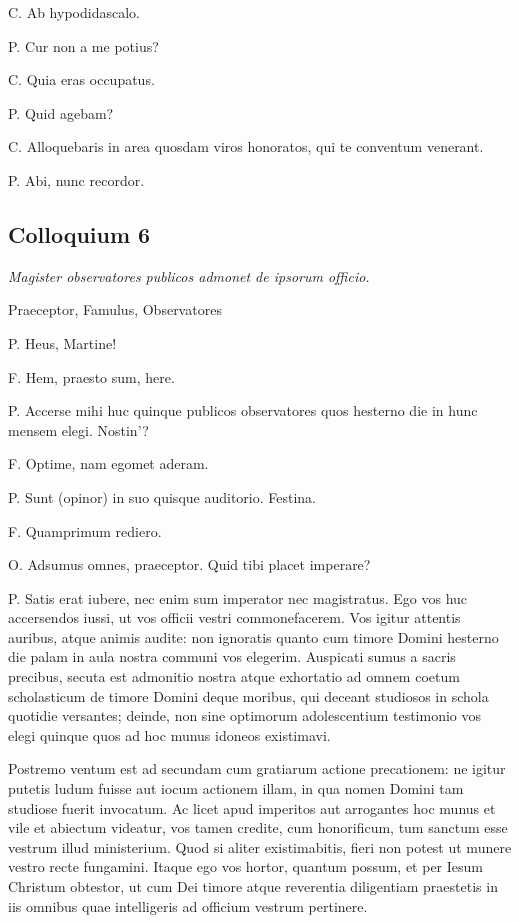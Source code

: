 \documentclass{article}
\begin{document}
C. Ab hypodidascalo.

P. Cur non a me potius?

C. Quia eras occupatus.

P. Quid agebam?

C. Alloquebaris in area quosdam viros honoratos, qui te conventum venerant.

P. Abi, nunc recordor.

\subsection{Colloquium 6}
\emph{Magister observatores publicos admonet de ipsorum officio.}

Praeceptor, Famulus, Observatores

P. Heus, Martine!

F. Hem, praesto sum, here.

P. Accerse mihi huc quinque publicos observatores quos hesterno die in hunc mensem elegi. Nostin'?

F. Optime, nam egomet aderam.

P. Sunt (opinor) in suo quisque auditorio. Festina.

F. Quamprimum rediero.

O. Adsumus omnes, praeceptor. Quid tibi placet imperare?

P. Satis erat iubere, nec enim sum imperator nec magistratus. Ego vos huc accersendos iussi, ut vos officii vestri commonefacerem. Vos igitur attentis auribus, atque animis audite: non ignoratis quanto cum timore Domini hesterno die palam in aula nostra communi vos elegerim. Auspicati sumus a sacris precibus, secuta est admonitio nostra atque exhortatio ad omnem coetum scholasticum de timore Domini deque moribus, qui deceant studiosos in schola quotidie versantes; deinde, non sine optimorum adolescentium testimonio vos elegi quinque quos ad hoc munus idoneos existimavi.

Postremo ventum est ad secundam cum gratiarum actione precationem: ne igitur putetis ludum fuisse aut iocum actionem illam, in qua nomen Domini tam studiose fuerit invocatum. Ac licet apud imperitos aut arrogantes hoc munus et vile et abiectum videatur, vos tamen credite, cum honorificum, tum sanctum esse vestrum illud ministerium. Quod si aliter existimabitis, fieri non potest ut munere vestro recte fungamini. Itaque ego vos hortor, quantum possum, et per Iesum Christum obtestor, ut cum Dei timore atque reverentia diligentiam praestetis in iis omnibus quae intelligeris ad officium vestrum pertinere. 
\end{document}
